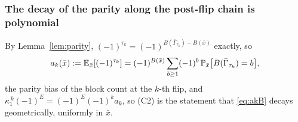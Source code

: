 \subsubsection{The decay of the parity along the post-flip chain is
polynomial}\label{sec:s12num}

By Lemma~\ref{lem:parity}, $(-1)^{\tau_k}=(-1)^{B(\bar\Gamma_{\tau_k})-B(\bar x)}$
exactly, so
\begin{equation}\label{eq:akB}
a_k(\bar x):=\mathbb{E}_{\bar x}[(-1)^{\tau_k}]=(-1)^{B(\bar x)}\sum_{b\ge1}(-1)^b\,
\mathbb{P}_{\bar x}\bigl[B(\bar\Gamma_{\tau_k})=b\bigr],
\end{equation}
the parity bias of the block count at the $k$-th flip, and
$\kappa_1^{\,k}(-1)^E=(-1)^{E}(-1)^ka_k$, so (C2) is the statement that
\eqref{eq:akB} decays geometrically, uniformly in $\bar x$.

